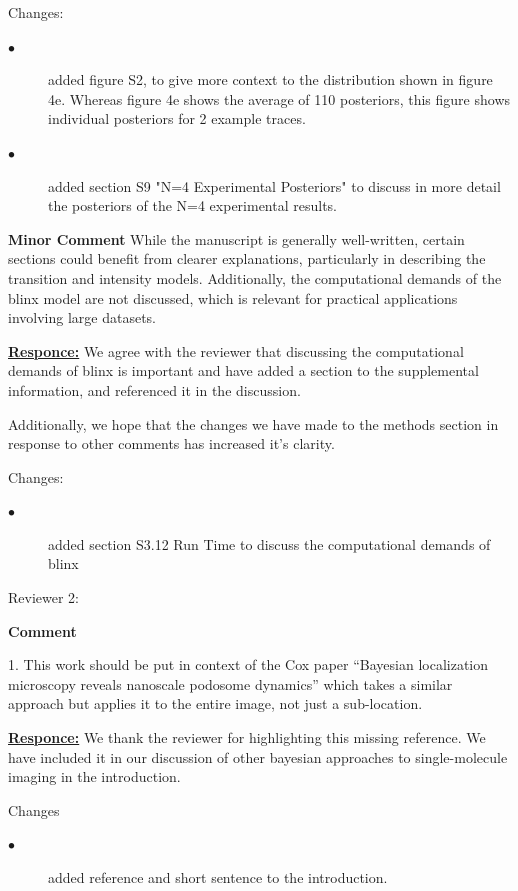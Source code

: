 \documentclass{article}
\begin{document}
Changes:
\begin{description}
    \item[$\bullet$] added figure S2, to give more context to the distribution shown in figure 4e. Whereas figure 4e 
    shows the average of 110 posteriors, this figure shows individual posteriors for 2 example traces.
    \item[$\bullet$] added section S9 "N=4 Experimental Posteriors" to discuss in more detail the posteriors of the N=4 experimental results.
\end{description}

\textbf{Minor Comment}
While the manuscript is generally well-written, certain sections could benefit from clearer 
explanations, particularly in describing the transition and intensity models. Additionally, 
the computational demands of the blinx model are not discussed, which is relevant for practical 
applications involving large datasets.

\underline{\textbf{Responce:}}
We agree with the reviewer that discussing the computational demands of blinx is important and
have added a section to the supplemental information, and referenced it in the discussion.

Additionally, we hope that the changes we have made to the methods section in response to other 
comments has increased it's clarity.

Changes:
\begin{description}
    \item[$\bullet$] added section S3.12 Run Time to discuss the computational demands of blinx
\end{description}

Reviewer 2:

\textbf{Comment}

1. This work should be put in context of the Cox paper 
“Bayesian localization microscopy reveals nanoscale podosome dynamics” 
which takes a similar approach but applies it to the entire image, not just a sub-location.

\underline{\textbf{Responce:}}
We thank the reviewer for highlighting this missing reference. We have included it in our discussion of 
other bayesian approaches to single-molecule imaging in the introduction.

Changes
\begin{description}
    \item[$\bullet$] added reference and short sentence to the introduction.
\end{description}
\end{document}
